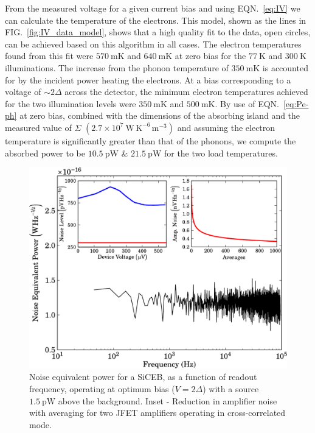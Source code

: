 \documentclass[aip, apl, a4paper, amsmath,amssymb, reprint]{revtex4-1}
\begin{document}
From the measured voltage for a given current bias and using EQN.~\ref{eq:IV} we can calculate the temperature of the electrons. This model, shown as the lines in FIG.~\ref{fig:IV_data_model}, shows that a high quality fit to the data, open circles, can be achieved based on this algorithm in all cases. The electron temperatures found from this fit were $570~\mathrm{mK}$ and $640~\mathrm{mK}$ at zero bias for the $77~\mathrm{K}$ and $300~\mathrm{K}$ illuminations. The increase from the phonon temperature of $350~\mathrm{mK}$ is accounted for by the incident power heating the electrons. At a bias corresponding to a voltage of $\sim 2\Delta$ across the detector, the minimum electron temperatures achieved for the two illumination levels were $350~\mathrm{mK}$ and $500~\mathrm{mK}$. By use of EQN.~\ref{eq:Pe-ph} at zero bias, combined with the dimensions of the absorbing island and the measured value of $\Sigma$ $(2.7 \times 10^{7}~\mathrm{W\,K^{-6}\,m^{-3}})$ and assuming the electron temperature is significantly greater than that of the phonons, we compute the absorbed power to be $10.5~\mathrm{pW}$ \& $21.5~\mathrm{pW}$ for the two load temperatures.
\begin{figure}[t]
\includegraphics[width = 0.8\columnwidth]{NEP_ampNoise_APL}
\caption{Noise equivalent power for a SiCEB, as a function of readout frequency, operating at optimum bias ($V=2\Delta$) with a source $1.5~\mathrm{pW}$ above the background. Inset - Reduction in amplifier noise with averaging for two JFET amplifiers operating in cross-correlated mode.}
\label{fig:NEP_ampNoise}
\end{figure}
\end{document}
